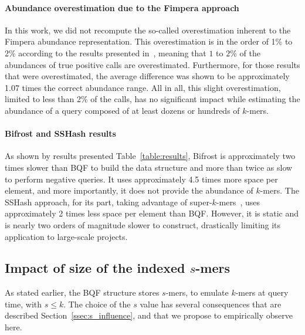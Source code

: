 \paragraph{Abundance overestimation due to the Fimpera approach}
In this work, we did not recompute the so-called overestimation inherent to the Fimpera abundance representation. This overestimation is in the order of 1\% to 2\% according to the results presented in~\cite{fimpera_2023}, meaning that $1$ to $2$\% of the abundances of true positive calls are overestimated. Furthermore, for those results that were overestimated, the average difference was shown to be approximately 1.07 times the correct abundance range. All in all, this slight overestimation, limited to less than 2\% of the calls, has no significant impact while estimating the abundance of a query composed of at least dozens or hundreds of $k$-mers.

\paragraph{Bifrost and SSHash results}
As shown by results presented Table~\ref{table:results}, Bifrost is approximately two times slower than BQF to build the data structure and more than twice as slow to perform negative queries. It uses approximately 4.5 times more space per element, and more importantly, it does not provide the abundance of $k$-mers. 
The SSHash approach, for its part, taking advantage of super-$k$-mers~\cite{superkmer_2013}, uses approximately 2 times less space per element than BQF. However, it is static and is nearly two orders of magnitude slower to construct, drastically limiting its application to large-scale projects.

\subsection{Impact of size of the indexed $s$-mers}\label{ssec:s_impact}
As stated earlier, the BQF structure stores $s$-mers, to emulate $k$-mers at query time, with $s\leq k$.
The choice of the $s$ value has several consequences that are described Section~\ref{ssec:s_influence}, and that we propose to empirically observe here.


